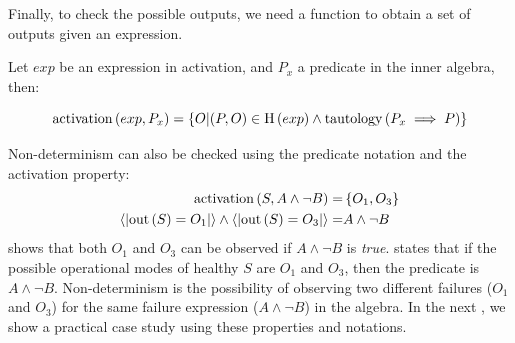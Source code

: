 Finally, to check the possible outputs, we need a function to obtain a set of outputs given an expression.

\begin{definition}[Activation]
\label{def:activation}
Let $exp$ be an expression in \ac{activation}, and $P_x$ a predicate in the inner algebra, then:

\begin{equation}
\label{eq:activation}
\activation{exp}{P_x} = \left\{
    O | (P, O) \in \healthinessfun{exp} \land \tautology{P_x \implies P}
  \right\}
\end{equation}

\end{definition}

Non-determinism can also be checked using the predicate notation and the activation property:
\begin{subequations}
\begin{align}
\mathrm{activation}\left(S, A \land \lnot B\right) = &
  \left\{O_1, O_3\right\}\label{eq:s-nondet-activation}\\
\left\langle\left| \mathrm{out}\left(S\right) = O_1 \right|\right\rangle \land 
  \left\langle\left| \mathrm{out}\left(S\right) = O_3 \right|\right\rangle = & A \land \lnot B\label{eq:s-nondet-pred}
\end{align}
\end{subequations}
%
 shows that both $O_1$ and $O_3$ can be observed if $A \land \lnot B$ is \emph{true}. 
 states that if the possible operational modes of healthy $S$ are $O_1$ and $O_3$, then the predicate is $A \land \lnot B$.
Non-determinism is the possibility of observing two different failures ($O_1$ and $O_3$) for the same failure expression ($A \land \lnot B$) in the algebra.
In the next , we show a practical case study using these properties and notations.

